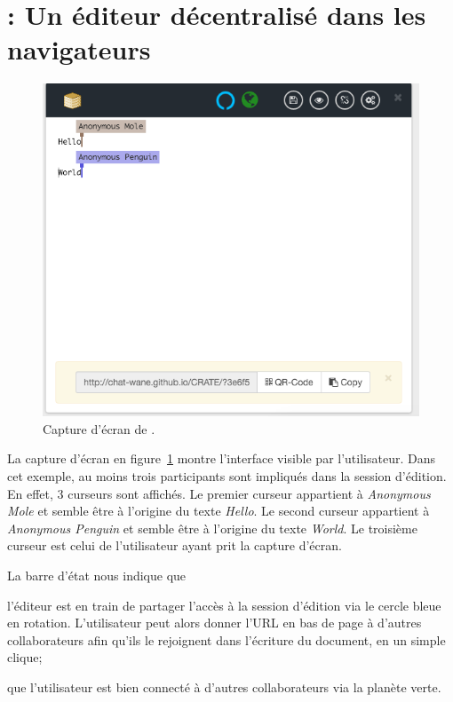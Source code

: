 
\section{\CRATE : Un éditeur décentralisé dans les navigateurs}
\label{editor:sec:crate}

\begin{figure}
  \begin{center}
    \includegraphics[scale=0.5]{img/editor/cratescreenshot.png}
    \caption{\label{editor:img:screenshot}Capture d'écran de \CRATE.}
  \end{center}
\end{figure}

La capture d'écran en figure~\ref{editor:img:screenshot} montre l'interface
visible par l'utilisateur. Dans cet exemple, au moins trois participants sont
impliqués dans la session d'édition. En effet, 3 curseurs sont affichés. Le
premier curseur appartient à \emph{Anonymous Mole} et semble être à l'origine du
texte \emph{Hello}. Le second curseur appartient à \emph{Anonymous Penguin} et
semble être à l'origine du texte \emph{World}. Le troisième curseur est celui de
l'utilisateur ayant prit la capture d'écran.

La barre d'état nous indique que
\begin{inparaenum}[(i)]
\item l'éditeur est en train de partager l'accès à la session d'édition via le
  cercle bleue en rotation. L'utilisateur peut alors donner l'URL en bas de page
  à d'autres collaborateurs afin qu'ils le rejoignent dans l'écriture du
  document, en un simple clique;
\item que l'utilisateur est bien connecté à d'autres collaborateurs via la
  planète verte.
\end{inparaenum}

